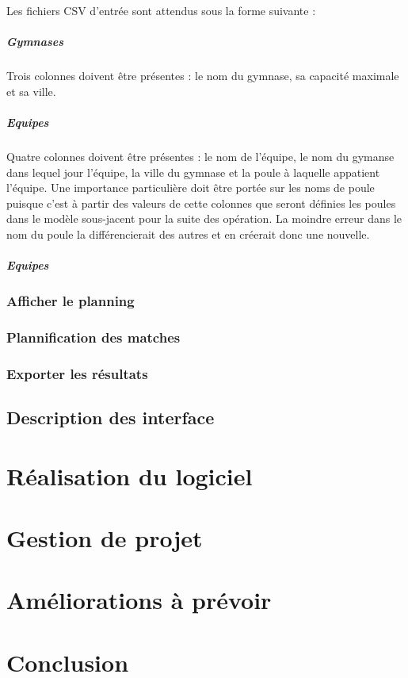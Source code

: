 \documentclass[final, noposter]{polytech/polytech}
\begin{document}
			Les fichiers CSV d'entrée sont attendus sous la forme suivante :

			\paragraph{Gymnases}
				Trois colonnes doivent être présentes : le nom du gymnase, sa capacité maximale et sa ville.

			\paragraph{Equipes}
				Quatre colonnes doivent être présentes : le nom de l'équipe, le nom du gymanse dans lequel jour l'équipe, la ville du gymnase et la poule à laquelle appatient l'équipe.
				Une importance particulière doit être portée sur les noms de poule puisque c'est à partir des valeurs de cette colonnes que seront définies les poules dans le modèle sous-jacent pour la suite des opération. La moindre erreur dans le nom du poule la différencierait des autres et en créerait donc une nouvelle.

			\paragraph{Equipes}

		\subsection{Afficher le planning}

		\subsection{Plannification des matches}

		\subsection{Exporter les résultats}

	\section{Description des interface}
	
\chapter{Réalisation du logiciel}

\chapter{Gestion de projet}

\chapter{Améliorations à prévoir}

\chapter{Conclusion}
\end{document}
